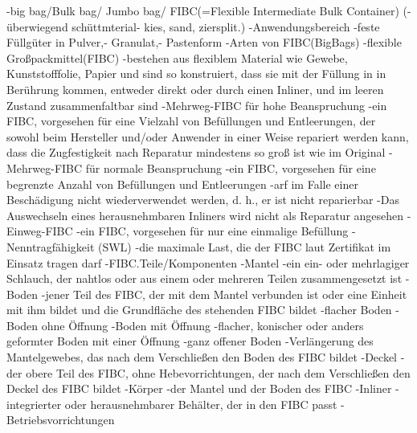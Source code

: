         -big bag/Bulk bag/ Jumbo bag/ FIBC(=Flexible Intermediate Bulk Container)
            (-überwiegend schüttmterial- kies, sand, ziersplit.)
            -Anwendungsbereich
                -feste Füllgüter in Pulver,- Granulat,- Pastenform
            -Arten von FIBC(BigBags)
                -flexible Großpackmittel(FIBC)
                    -bestehen aus flexiblem Material wie Gewebe, Kunststofffolie, Papier und sind so konstruiert, dass sie mit der Füllung in in Berührung kommen, entweder direkt oder durch einen Inliner, und im leeren Zustand zusammenfaltbar sind
                -Mehrweg-FIBC für hohe Beanspruchung
                    -ein FIBC, vorgesehen für eine Vielzahl von Befüllungen und Entleerungen, der sowohl beim Hersteller und/oder Anwender in einer Weise repariert werden kann, dass die Zugfestigkeit nach Reparatur mindestens so groß ist wie im Original
                -Mehrweg-FIBC für normale Beanspruchung
                    -ein FIBC, vorgesehen für eine begrenzte Anzahl von Befüllungen und Entleerungen
                    -arf im Falle einer Beschädigung nicht wiederverwendet werden, d. h., er ist nicht reparierbar
                    -Das Auswechseln eines herausnehmbaren Inliners wird nicht als Reparatur angesehen
                -Einweg-FIBC
                    -ein FIBC, vorgesehen für nur eine einmalige Befüllung
                -Nenntragfähigkeit (SWL)
                    -die maximale Last, die der FIBC laut Zertifikat im Einsatz tragen darf
                -FIBC.Teile/Komponenten
                    -Mantel
                        -ein ein- oder mehrlagiger Schlauch, der nahtlos oder aus einem oder mehreren Teilen zusammengesetzt ist
                    -Boden
                        -jener Teil des FIBC, der mit dem Mantel verbunden ist oder eine Einheit mit ihm bildet und die Grundfläche des stehenden FIBC bildet
                    -flacher Boden
                        -Boden ohne Öffnung
                    -Boden mit Öffnung
                        -flacher, konischer oder anders geformter Boden mit einer Öffnung
                    -ganz offener Boden
                        -Verlängerung des Mantelgewebes, das nach dem Verschließen den Boden des FIBC bildet
                    -Deckel
                        -der obere Teil des FIBC, ohne Hebevorrichtungen, der nach dem Verschließen den Deckel des FIBC bildet
                    -Körper
                        -der Mantel und der Boden des FIBC
                    -Inliner
                        -integrierter oder herausnehmbarer Behälter, der in den FIBC passt
                -Betriebsvorrichtungen
